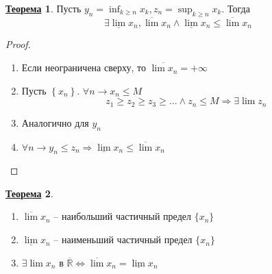 \documentclass[12pt]{article}
\newenvironment{MyList}[1][4pt]{
  \begin{enumerate}[1.]
  \setlength{\parskip}{0pt}
  \setlength{\itemsep}{#1}
}{       
  \end{enumerate}
}
\def\R{\mathbb{R}}       %
\def\SO{\Rightarrow}     %
\def\EQ{\Leftrightarrow} %
\def\Pagebreak{\pagebreak\vspace*{-1.5em}}
\theoremstyle{definition} %
\newtheorem{Thm}{\underline{Теорема}}[subsection] %
\theoremstyle{plain} %
\theoremstyle{remark} %
\begin{document}
\Pagebreak
\begin{Thm}
    Пусть $y_n = \inf_{k \geqslant n}x_k, z_n = \sup_{k \geqslant n} x_k$. Тогда
    \[\exists \underline{\lim} x_n, \overline{\lim} x_n \wedge \underline{\lim} x_n \leqslant \overline{\lim} x_n\] 
\end{Thm}

\begin{proof}
    \begin{MyList}
        \item Если неограничена сверху, то $\overline{\lim x_n} = +\infty$
        \item Пусть $\left\{x_n\right\}$. $\forall n \to x_n \leqslant M$
        \[z_1 \geqslant z_2 \geqslant z_3 \geqslant ... \wedge z_n \leqslant M \SO \exists \lim z_n\]
        \item Аналогично для $y_n$
        \item $\forall n \to y_n \leqslant z_n \SO \underline{\lim}x_n \leqslant \overline{\lim}x_n$  
    \end{MyList}
\end{proof}

\begin{Thm}
    \begin{MyList}
        \item $\overline{\lim} x_n$ -- наибольший частичный предел $\{x_n\}$  
        \item $\underline{\lim} x_n$ -- наименьший частичный предел $\{x_n\}$ 
        \item $\exists \lim x_n$ в $\overline{\R} \EQ \overline{\lim}x_n = \underline{\lim}x_n$  
    \end{MyList}
\end{Thm}
\end{document}
